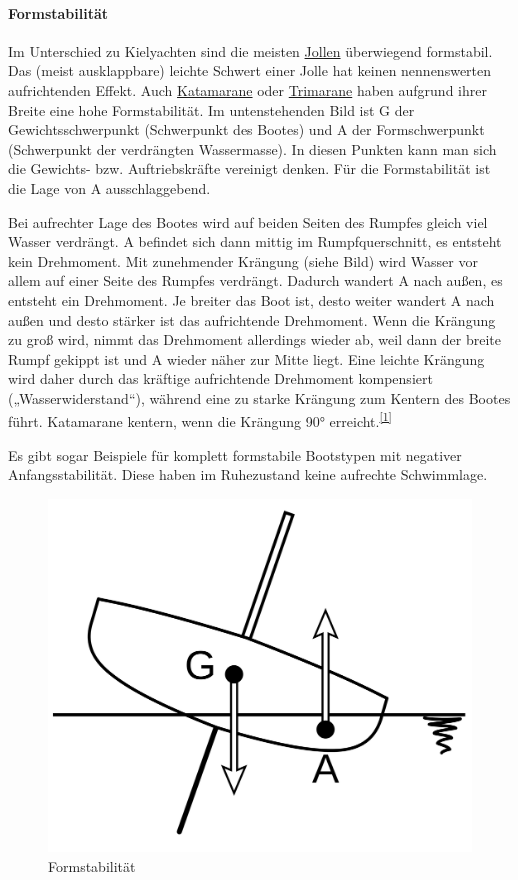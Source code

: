\paragraph{Formstabilität}
Im Unterschied zu Kielyachten sind die meisten \href{https://de.wikipedia.org/wiki/Jolle}{Jollen} überwiegend formstabil. Das (meist ausklappbare) leichte Schwert einer Jolle hat keinen nennenswerten aufrichtenden Effekt. Auch \href{https://de.wikipedia.org/wiki/Segelkatamaran}{Katamarane} oder \href{https://de.wikipedia.org/wiki/Trimaran}{Trimarane} haben aufgrund ihrer Breite eine hohe Formstabilität. 
Im untenstehenden Bild ist G der Gewichtsschwerpunkt (Schwerpunkt des Bootes) und A der Formschwerpunkt (Schwerpunkt der verdrängten Wassermasse). In diesen Punkten kann man sich die Gewichts- bzw. Auftriebskräfte vereinigt denken. Für die Formstabilität ist die Lage von A ausschlaggebend. 

Bei aufrechter Lage des Bootes wird auf beiden Seiten des Rumpfes gleich viel Wasser verdrängt. A befindet sich dann mittig im Rumpfquerschnitt, es entsteht kein Drehmoment. Mit zunehmender Krängung (siehe Bild) wird Wasser vor allem auf einer Seite des Rumpfes verdrängt. Dadurch wandert A nach außen, es entsteht ein Drehmoment. Je breiter das Boot ist, desto weiter wandert A nach außen und desto stärker ist das aufrichtende Drehmoment. Wenn die Krängung zu groß wird, nimmt das Drehmoment allerdings wieder ab, weil dann der breite Rumpf gekippt ist und A wieder näher zur Mitte liegt. Eine leichte Krängung wird daher durch das kräftige aufrichtende Drehmoment kompensiert („Wasserwiderstand“), während eine zu starke Krängung zum Kentern des Bootes führt. Katamarane kentern, wenn die Krängung 90° erreicht.\textsuperscript{\href{https://de.wikipedia.org/wiki/Stabilit\%C3\%A4t_(Schiffsk\%C3\%B6rper)\#cite_note-Seemannschaft,_Seite_163-1}{[1]}} 

Es gibt sogar Beispiele für komplett formstabile Bootstypen mit negativer Anfangsstabilität. Diese haben im Ruhezustand keine aufrechte Schwimmlage. 
\begin{figure}
    \centering
    \includegraphics[width=0.5\linewidth]{Segeln_Formstabilitaet.svg.png}
    \caption{Formstabilität }
    \label{fig:enter-label}
\end{figure}

